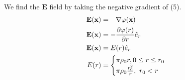 \documentclass[]{book}
\begin{document}
We find the $\textbf{E}$ field by taking the negative gradient of (5).
\begin{equation}
\begin{split}
\textbf{E}(\textbf{x}) &= - \nabla\varphi(\textbf{x}) \\
\textbf{E}(\textbf{x}) &= - \pdv{\varphi(r)}{r}\hat{e}_r \\
\textbf{E}(\textbf{x}) &= E(r)\hat{e}_r \\
E(r) & = \begin{cases}
\pi\rho_0r  , 0\leq r\leq r_0 \\
\pi\rho_0 \frac{r_0^2}{r}, \text{ } r_0 < r \\
\end{cases}
\end{split}
\end{equation}
\end{document}
